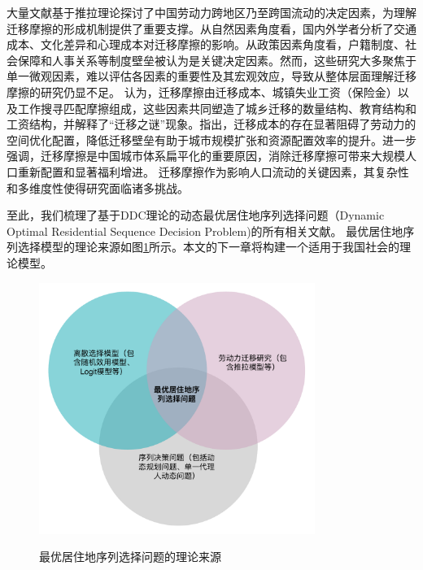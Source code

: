\documentclass[a4paper,12pt,oneside, fontset=mac]{ctexbook} %
\begin{document}
大量文献基于推拉理论探讨了中国劳动力跨地区乃至跨国流动的决定因素，为理解迁移摩擦的形成机制提供了重要支撑。从自然因素角度看，国内外学者分析了交通成本、文化差异和心理成本对迁移摩擦的影响。从政策因素角度看，户籍制度、社会保障和人事关系等制度壁垒被认为是关键决定因素。然而，这些研究大多聚焦于单一微观因素，难以评估各因素的重要性及其宏观效应，导致从整体层面理解迁移摩擦的研究仍显不足。
\cite{WangLiLiWoGuoRenKouQianYiChengBenChengShiGuiMoYuShengChanLu2020}认为，迁移摩擦由迁移成本、城镇失业工资（保险金）以及工作搜寻匹配摩擦组成，这些因素共同塑造了城乡迁移的数量结构、教育结构和工资结构，并解释了“迁移之谜”现象。\cite{WangLiLiWoGuoRenKouQianYiChengBenChengShiGuiMoYuShengChanLu2020}指出，迁移成本的存在显著阻碍了劳动力的空间优化配置，降低迁移壁垒有助于城市规模扩张和资源配置效率的提升。\cite{LiuXiuYanFangJieQianYiMoCaYuZhongGuoChengShiDeGuiMoFenBuLiLunMoXingYuJieGouShiGuJi2017}进一步强调，迁移摩擦是中国城市体系扁平化的重要原因，消除迁移摩擦可带来大规模人口重新配置和显著福利增进。
迁移摩擦作为影响人口流动的关键因素，其复杂性和多维度性使得研究面临诸多挑战。


至此，我们梳理了基于DDC理论的动态最优居住地序列选择问题（Dynamic Optimal Residential Sequence Decision Problem)的所有相关文献。
最优居住地序列选择模型的理论来源如图\ref{fig:最优居住地序列选择问题的理论来源venn diagram}所示。本文的下一章将构建一个适用于我国社会的理论模型。
\begin{figure}[!ht]
\centering
\caption{最优居住地序列选择问题的理论来源}
\includegraphics[width=0.8\textwidth]{images/optimal_residential_sequence.drawio.pdf}
\label{fig:最优居住地序列选择问题的理论来源venn diagram}
\end{figure}
\end{document}
